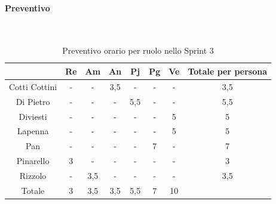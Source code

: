 \documentclass{article}
\begin{document}
                \paragraph{Preventivo}\mbox{}\\
                \begin{table}[H]
                    \centering
                    \begin{tabular}{|c|c|c|c|c|c|c|c|}
                    \hline
                                    & Re  & Am  & An  & Pj  & Pg  & Ve  & Totale per persona \\ \hline
                    Cotti Cottini & -   & -   & 3,5 & -   & -   & -   & 3,5                \\ \hline
                    Di Pietro     & -   & -   & -   & 5,5 & -   & -   & 5,5                \\ \hline
                    Diviesti      & -   & -   & -   & -   & -   & 5   & 5                  \\ \hline
                    Lapenna       & -   & -   & -   & -   & -   & 5   & 5                  \\ \hline
                    Pan           & -   & -   & -   & -   & 7  & -   & 7                 \\ \hline
                    Pinarello     & 3   & -   & -   & -   & -   & -   & 3                  \\ \hline
                    Rizzolo       & -   & 3,5 & -   & -   & -   & -   & 3,5                \\ \hline
                    Totale        & 3   & 3,5 & 3,5 & 5,5 & 7  & 10  &                    \\ \hline
                    \end{tabular}
                    \caption{Preventivo orario per ruolo nello Sprint 3}
                \end{table}

\end{document}
